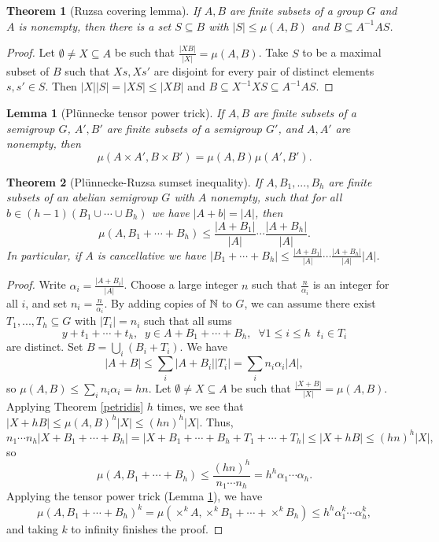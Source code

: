 \documentclass[letterpaper,11pt]{article}
\newtheorem{thm}{Theorem}
\newtheorem{lem}{Lemma}
\theoremstyle{definition}
\theoremstyle{remark}
\begin{document}
\begin{thm}[Ruzsa covering lemma] If $A,B$ are finite subsets of a group $G$ and $A$ is nonempty, then there is a set $S\subseteq B$ with $|S| \le \mu(A,B)$ and $B \subseteq A^{-1}AS$.
\end{thm}
\begin{proof} Let $\emptyset \ne X\subseteq A$ be such that $\frac{|XB|}{|X|} = \mu(A,B)$. Take $S$ to be a maximal subset of $B$ such that $Xs, Xs'$ are disjoint for every pair of distinct elements $s,s' \in S$. Then $|X||S| = |XS| \le |XB|$ and $B \subseteq X^{-1}XS \subseteq A^{-1}AS$.
\end{proof}

\begin{lem}[Pl\"unnecke tensor power trick]\label{tensor} If $A,B$ are finite subsets of a semigroup $G$, $A',B'$ are finite subsets of a semigroup $G'$, and $A,A'$ are nonempty, then
\[
\mu(A\times A',B\times B') = \mu(A,B)\mu(A',B').
\]
\end{lem}

\begin{thm}[Pl\"unnecke-Ruzsa sumset inequality]\label{sumset} If $A,B_1, ..., B_h$ are finite subsets of an abelian semigroup $G$ with $A$ nonempty, such that for all $b \in (h-1)(B_1\cup\cdots\cup B_h)$ we have $|A+b| = |A|$, then
\[
\mu(A,B_1 + \cdots + B_h) \le \frac{|A+B_1|}{|A|}\cdots\frac{|A+B_h|}{|A|}.
\]
In particular, if $A$ is cancellative we have $|B_1 + \cdots + B_h| \le \frac{|A+B_1|}{|A|}\cdots\frac{|A+B_h|}{|A|}|A|$.
\end{thm}
\begin{proof} Write $\alpha_i = \frac{|A+B_i|}{|A|}$. Choose a large integer $n$ such that $\frac{n}{\alpha_i}$ is an integer for all $i$, and set $n_i = \frac{n}{\alpha_i}$. By adding copies of $\mathbb{N}$ to $G$, we can assume there exist $T_1, ..., T_h\subseteq G$ with $|T_i| = n_i$ such that all sums
\[
y + t_1 + \cdots + t_h,\;\; y \in A+B_1+\cdots +B_h,\;\; \forall 1\le i\le h\;\; t_i\in T_i
\]
are distinct. Set $B = \bigcup_i (B_i+T_i)$. We have
\[
|A+B| \le \sum_i |A+B_i||T_i| = \sum_i n_i\alpha_i |A|,
\]
so $\mu(A,B) \le \sum_i n_i\alpha_i = hn$. Let $\emptyset \ne X \subseteq A$ be such that $\frac{|X+B|}{|X|} = \mu(A,B)$. Applying Theorem \ref{petridis} $h$ times, we see that $|X+hB| \le \mu(A,B)^h|X| \le (hn)^h|X|$. Thus,
\[
n_1\cdots n_h|X+B_1+\cdots +B_h| = |X+B_1+\cdots +B_h+T_1+\cdots +T_h| \le |X+hB| \le (hn)^h|X|,
\]
so
\[
\mu(A,B_1+\cdots +B_h) \le \frac{(hn)^h}{n_1\cdots n_h} = h^h\alpha_1\cdots \alpha_h.
\]
Applying the tensor power trick (Lemma \ref{tensor}), we have
\[
\mu(A,B_1+\cdots +B_h)^k = \mu(\times^kA,\times^kB_1+\cdots +\times^kB_h) \le h^h\alpha_1^k\cdots \alpha_h^k,
\]
and taking $k$ to infinity finishes the proof.
\end{proof}
\end{document}
